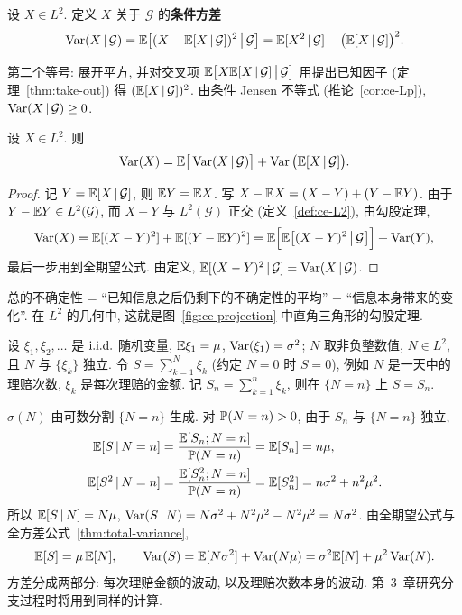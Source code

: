 \begin{definition}[条件方差]\label{def:conditional-variance}
设 $X\in L^2$. 定义 $X$ 关于 $\mathcal{G}$ 的\textbf{条件方差}
\[
\Var(X\,|\,\mathcal{G})=\E\big[(X-\E[X\,|\,\mathcal{G}])^2\,\big|\,\mathcal{G}\big]=\E[X^2\,|\,\mathcal{G}]-\big(\E[X\,|\,\mathcal{G}]\big)^2.
\]
\end{definition}

第二个等号: 展开平方, 并对交叉项 $\E\big[X\E[X\,|\,\mathcal{G}]\,\big|\,\mathcal{G}\big]$ 用提出已知因子 (定理~\ref{thm:take-out}) 得 $(\E[X\,|\,\mathcal{G}])^2$. 由条件 Jensen 不等式 (推论~\ref{cor:ce-Lp}), $\Var(X\,|\,\mathcal{G})\ge0$.

\begin{theorem}[全方差公式]\label{thm:total-variance}
设 $X\in L^2$. 则
\[
\Var(X)=\E\big[\Var(X\,|\,\mathcal{G})\big]+\Var\big(\E[X\,|\,\mathcal{G}]\big).
\]
\end{theorem}

\begin{proof}
记 $Y=\E[X\,|\,\mathcal{G}]$, 则 $\E Y=\E X$. 写 $X-\E X=(X-Y)+(Y-\E Y)$. 由于 $Y-\E Y\in L^2(\mathcal{G})$, 而 $X-Y$ 与 $L^2(\mathcal{G})$ 正交 (定义~\ref{def:ce-L2}), 由勾股定理,
\[
\Var(X)=\E[(X-Y)^2]+\E[(Y-\E Y)^2]=\E\Big[\E\big[(X-Y)^2\,\big|\,\mathcal{G}\big]\Big]+\Var(Y),
\]
最后一步用到全期望公式. 由定义, $\E[(X-Y)^2\,|\,\mathcal{G}]=\Var(X\,|\,\mathcal{G})$.
\end{proof}

\begin{intuition}
总的不确定性 = ``已知信息之后仍剩下的不确定性的平均'' + ``信息本身带来的变化''. 在 $L^2$ 的几何中, 这就是图~\ref{fig:ce-projection} 中直角三角形的勾股定理.
\end{intuition}

\begin{example}[随机和]\label{ex:random-sum}
设 $\xi_1,\xi_2,\dots$ 是 $\iid$ 随机变量, $\E\xi_1=\mu$, $\Var(\xi_1)=\sigma^2$; $N$ 取非负整数值, $N\in L^2$, 且 $N$ 与 $\{\xi_k\}$ 独立. 令 $S=\sum_{k=1}^N\xi_k$ (约定 $N=0$ 时 $S=0$), 例如 $N$ 是一天中的理赔次数, $\xi_k$ 是每次理赔的金额. 记 $S_n=\sum_{k=1}^n\xi_k$, 则在 $\{N=n\}$ 上 $S=S_n$.

$\sigma(N)$ 由可数分割 $\{N=n\}$ 生成. 对 $\P(N=n)>0$, 由于 $S_n$ 与 $\{N=n\}$ 独立,
\begin{align*}
\E[S\,|\,N=n]&=\frac{\E[S_n;N=n]}{\P(N=n)}=\E[S_n]=n\mu,\\
\E[S^2\,|\,N=n]&=\frac{\E[S_n^2;N=n]}{\P(N=n)}=\E[S_n^2]=n\sigma^2+n^2\mu^2.
\end{align*}
所以 $\E[S\,|\,N]=N\mu$, $\Var(S\,|\,N)=N\sigma^2+N^2\mu^2-N^2\mu^2=N\sigma^2$. 由全期望公式与全方差公式~\ref{thm:total-variance},
\[
\E[S]=\mu\,\E[N],\qquad \Var(S)=\E[N\sigma^2]+\Var(N\mu)=\sigma^2\E[N]+\mu^2\Var(N).
\]
方差分成两部分: 每次理赔金额的波动, 以及理赔次数本身的波动. 第~3~章研究分支过程时将用到同样的计算.
\end{example}

